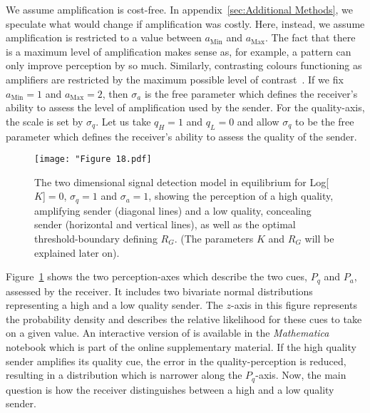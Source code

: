 \documentclass[a4paper,12pt]{article}
\numberwithin{equation}{section}
\numberwithin{figure}{section}
\begin{document}
We assume amplification is cost-free. In appendix~\ref{sec:Additional Methods}, we speculate what would change if amplification was costly. Here, instead, we assume amplification is restricted to a value between $a_{\text{Min}}$ and $a_{\text{Max}}$. The fact that there is a maximum level of amplification makes sense as, for example, a pattern can only improve perception by so much. Similarly, contrasting colours functioning as amplifiers are restricted by the maximum possible level of contrast~\cite{Hasson1991}. If we fix $a_{\text{Min}}=1$ and $a_{\text{Max}}=2$, then $\sigma_{a}$ is the free parameter which defines the receiver's ability to assess the level of amplification used by the sender. For the quality-axis, the scale is set by $\sigma_{q}$. Let us take $q_{H}=1$ and $q_{L}=0$ and allow $\sigma_{q}$ to be the free parameter which defines the receiver's ability to assess the quality of the sender.

\begin{figure}[h]
\captionsetup{width=365pt}
\begin{center}
\leavevmode
\texttt{[image: "Figure 18.pdf]}
\caption[Model showing the perception of a high and a low quality sender]{The two dimensional signal detection model in equilibrium for Log[$K$]$=0$, $\sigma_{q}=1$ and $\sigma_{a}=1$, showing the perception of a high quality, amplifying sender (diagonal lines) and a low quality, concealing sender (horizontal and vertical lines), as well as the optimal threshold-boundary defining $R_{G}$. (The parameters $K$ and $R_{G}$ will be explained later on).}
\label{fig:Figure 18.pdf}
\end{center}
\end{figure}

Figure~\ref{fig:Figure 18.pdf} shows the two perception-axes which describe the two cues, $P_{q}$ and $P_{a}$, assessed by the receiver. It includes two bivariate normal distributions representing a high and a low quality sender. The $z$-axis in this figure represents the probability density and describes the relative likelihood for these cues to take on a given value. An interactive version of is available in the \textit{Mathematica} notebook which is part of the online supplementary material. If the high quality sender amplifies its quality cue, the error in the quality-perception is reduced, resulting in a distribution which is narrower along the $P_{q}$-axis. Now, the main question is how the receiver distinguishes between a high and a low quality sender.
\end{document}
